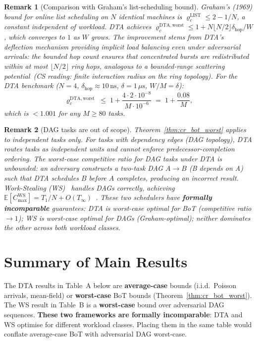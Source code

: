\documentclass[11pt,a4paper]{report}
\newtheorem{remark}{Remark}[section]
\newcommand{\physics}[2]{#1\ \textnormal{(\emph{CS reading}: #2)}}
\begin{document}
\begin{remark}[Comparison with Graham's list-scheduling bound]
Graham's (1969) bound for online list scheduling on $N$ identical machines
is $\varrho_c^{\mathrm{LIST}} \le 2 - 1/N$, a constant independent of workload.
DTA achieves $\varrho_c^{\mathrm{DTA,worst}} \le 1 + N\lfloor N/2\rfloor\delta_{\mathrm{hop}}/W$,
which converges to $1$ as $W$ grows.
The improvement stems from DTA's deflection mechanism providing implicit
load balancing even under adversarial arrivals:
the bounded hop count ensures that concentrated bursts are redistributed
within at most $\lfloor N/2 \rfloor$ ring hops, analogous to a
\physics{bounded-range scattering potential}{finite interaction radius on the
ring topology}.
For the DTA benchmark ($N=4$, $\delta_{\mathrm{hop}} \approx 10\,\mathrm{ns}$,
$\delta = 1\,\mu\mathrm{s}$, $W/M = \delta$):
\[
  \varrho_c^{\mathrm{DTA,worst}} \;\le\; 1 + \frac{4 \cdot 2 \cdot 10^{-8}}{M \cdot 10^{-6}}
  \;=\; 1 + \frac{0.08}{M},
\]
which is $< 1.001$ for any $M \ge 80$ tasks.
\end{remark}

\begin{remark}[DAG tasks are out of scope]
Theorem~\ref{thm:cr_bot_worst} applies to \emph{independent} tasks only.
For tasks with dependency edges (DAG topology), DTA routes tasks as
independent units and cannot enforce predecessor-completion ordering.
The worst-case competitive ratio for DAG tasks under DTA is
\emph{unbounded}: an adversary constructs a two-task DAG
$A \to B$ (B depends on A) such that DTA schedules $B$ before $A$ completes,
producing an incorrect result.
Work-Stealing (WS)~\cite{blumofe1999,acar2002} handles DAGs correctly,
achieving $\mathbb{E}[C_{\max}^{\mathrm{WS}}] = T_1/N + O(T_\infty)$~\cite{arora2001}.
These two schedulers have \textbf{formally incomparable} guarantees:
DTA is worst-case optimal for BoT (competitive ratio $\to 1$);
WS is worst-case optimal for DAGs (Graham-optimal);
neither dominates the other across both workload classes.
\end{remark}

\section*{Summary of Main Results}

\begin{tcolorbox}[colback=yellow!5!white,colframe=orange!60!black,title=Scope Warning]
The DTA results in Table~A below are \textbf{average-case} bounds (i.i.d.\ Poisson
arrivals, mean-field) or \textbf{worst-case} BoT bounds (Theorem~\ref{thm:cr_bot_worst}).
The WS result in Table~B is a \textbf{worst-case} bound over adversarial DAG sequences.
\textbf{These two frameworks are formally incomparable}: DTA and WS optimise
for different workload classes.  Placing them in the same table would conflate
average-case BoT with adversarial DAG worst-case.
\end{tcolorbox}
\end{document}
